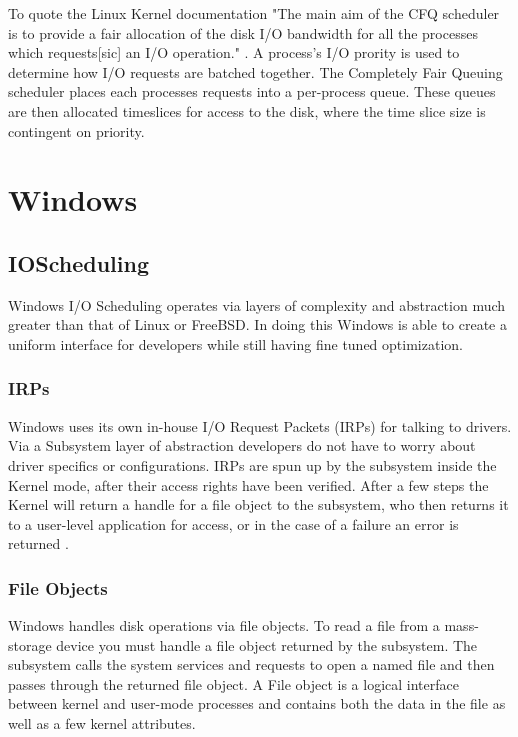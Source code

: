 \documentclass[letterpaper,10pt,notitlepage,fleqn]{article}
\begin{document}
To quote the Linux Kernel documentation "The main aim of the CFQ scheduler is to 
provide a fair allocation of the disk I/O bandwidth for all the processes which requests[sic]
an I/O operation." \cite{CFQ}. A process's I/O prority is used to determine how I/O requests
are batched together. The Completely Fair Queuing scheduler places each processes requests 
into a per-process queue. These queues are then allocated timeslices for access to the disk,
where the time slice size is contingent on priority. 



\section{Windows}

\subsection{IOScheduling}

Windows I/O Scheduling operates via layers of complexity and abstraction much greater than
that of Linux or FreeBSD. In doing this Windows is able to create a uniform interface for 
developers while still having fine tuned optimization.

\subsubsection{IRPs}

Windows uses its own in-house I/O Request Packets (IRPs) for talking to drivers. Via a Subsystem 
layer of abstraction developers do not have to worry about driver specifics or configurations.
IRPs are spun up by the subsystem inside the Kernel mode, after their access rights have been 
verified. After a few steps the Kernel will return a handle for a file object to the subsystem, who
then returns it to a user-level application for access, or in the case of a failure an error is 
returned \cite{winIOView}.


\subsubsection{ File Objects }

Windows handles disk operations via file objects. To read a file from a mass-storage device you must
handle a file object returned by the subsystem. The subsystem calls the system services and requests 
to open a named file and then passes through the returned file object. A File object is a logical 
interface between kernel and user-mode processes and contains both the data in the file as well as
a few kernel attributes.
\cite{winFileOBJ} \cite{fOBJ}
\end{document}
